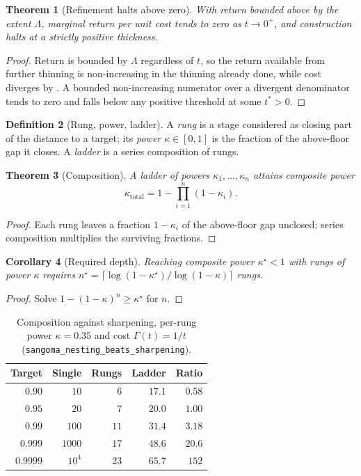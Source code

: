 \documentclass[11pt,twocolumn,a4paper]{article}
\newtheorem{theorem}{Theorem}[section]
\newtheorem{corollary}[theorem]{Corollary}
\theoremstyle{definition}
\newtheorem{definition}[theorem]{Definition}
\theoremstyle{remark}
\newcommand{\thick}{t}
\newcommand{\pot}{\kappa}
\begin{document}
\begin{theorem}[Refinement halts above zero]
\label{thm:refine}
With return bounded above by the extent $\Lambda$, marginal return per unit cost
tends to zero as $\thick\to0^{+}$, and construction halts at a strictly positive
thickness.
\end{theorem}

\begin{proof}
Return is bounded by $\Lambda$ regardless of $\thick$, so the return available
from further thinning is non-increasing in the thinning already done, while cost
diverges by . A bounded non-increasing numerator over a
divergent denominator tends to zero and falls below any positive threshold at
some $\thick^{\ast}>0$.
\end{proof}

\begin{definition}[Rung, power, ladder]
\label{def:rung}
A \emph{rung} is a stage considered as closing part of the distance to a target;
its \emph{power} $\pot\in[0,1]$ is the fraction of the above-floor gap it closes.
A \emph{ladder} is a series composition of rungs.
\end{definition}

\begin{theorem}[Composition]
\label{thm:compose}
A ladder of powers $\pot_1,\dots,\pot_n$ attains composite power
\[
  \pot_{\mathrm{total}} = 1-\prod_{i=1}^{n}(1-\pot_i).
\]
\end{theorem}

\begin{proof}
Each rung leaves a fraction $1-\pot_i$ of the above-floor gap unclosed; series
composition multiplies the surviving fractions.
\end{proof}

\begin{corollary}[Required depth]
\label{cor:rungcount}
Reaching composite power $\pot^{\star}<1$ with rungs of power $\pot$ requires
$n^{\star}=\lceil \log(1-\pot^{\star})/\log(1-\pot)\rceil$ rungs.
\end{corollary}

\begin{proof}
Solve $1-(1-\pot)^{n}\ge\pot^{\star}$ for $n$.
\end{proof}

\begin{table}[H]
\centering
\small
\caption{Composition against sharpening, per-rung power $\pot=0.35$ and cost
$\Gamma(\thick)=1/\thick$ (\texttt{sangoma\_nesting\_beats\_sharpening}).}
\label{tab:crossover}
\begin{tabular}{@{}rrrrr@{}}
\toprule
Target & Single & Rungs & Ladder & Ratio \\
\midrule
$0.90$   & $10$   & $6$  & $17.1$ & $0.58$ \\
$0.95$   & $20$   & $7$  & $20.0$ & $1.00$ \\
$0.99$   & $100$  & $11$ & $31.4$ & $3.18$ \\
$0.999$  & $1000$ & $17$ & $48.6$ & $20.6$ \\
$0.9999$ & $10^4$ & $23$ & $65.7$ & $152$ \\
\bottomrule
\end{tabular}
\end{table}
\end{document}
